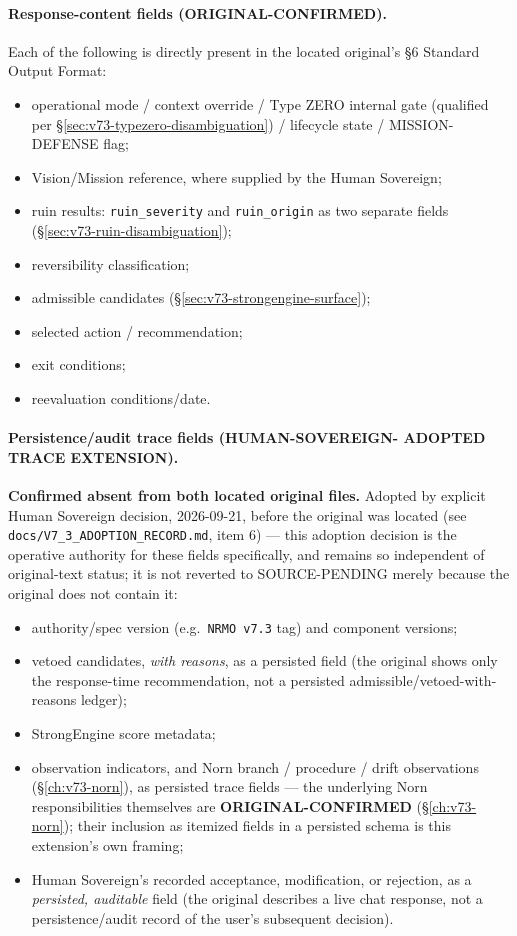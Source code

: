 \paragraph{Response-content fields (\textbf{ORIGINAL-CONFIRMED}).} Each
of the following is directly present in the located original's \S6
Standard Output Format:

\begin{itemize}
\item operational mode / context override / Type ZERO internal gate
(qualified per \S\ref{sec:v73-typezero-disambiguation}) / lifecycle
state / MISSION-DEFENSE flag;
\item Vision/Mission reference, where supplied by the Human Sovereign;
\item ruin results: \texttt{ruin\_severity} and \texttt{ruin\_origin}
as two separate fields (\S\ref{sec:v73-ruin-disambiguation});
\item reversibility classification;
\item admissible candidates (\S\ref{sec:v73-strongengine-surface});
\item selected action / recommendation;
\item exit conditions;
\item reevaluation conditions/date.
\end{itemize}

\paragraph{Persistence/audit trace fields (\textbf{HUMAN-SOVEREIGN-
ADOPTED TRACE EXTENSION}).} \textbf{Confirmed absent from both located
original files.} Adopted by explicit Human Sovereign decision,
2026-09-21, before the original was located (see
\texttt{docs/V7\_3\_ADOPTION\_RECORD.md}, item 6) --- this adoption
decision is the operative authority for these fields specifically, and
remains so independent of original-text status; it is not reverted to
SOURCE-PENDING merely because the original does not contain it:

\begin{itemize}
\item authority/spec version (e.g.\ \texttt{NRMO v7.3} tag) and
component versions;
\item vetoed candidates, \emph{with reasons}, as a persisted field
(the original shows only the response-time recommendation, not a
persisted admissible/vetoed-with-reasons ledger);
\item StrongEngine score metadata;
\item observation indicators, and Norn branch / procedure / drift
observations (\S\ref{ch:v73-norn}), as persisted trace fields --- the
underlying Norn responsibilities themselves are
\textbf{ORIGINAL-CONFIRMED} (\S\ref{ch:v73-norn}); their inclusion as
itemized fields in a persisted schema is this extension's own framing;
\item Human Sovereign's recorded acceptance, modification, or
rejection, as a \emph{persisted, auditable} field (the original
describes a live chat response, not a persistence/audit record of the
user's subsequent decision).
\end{itemize}

